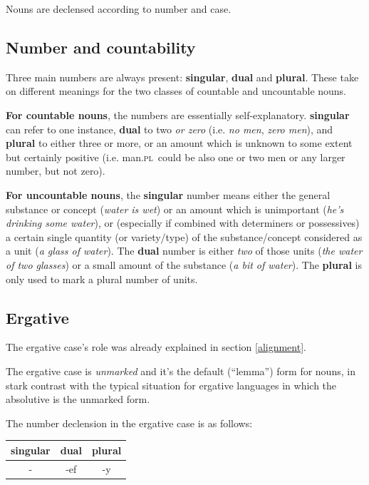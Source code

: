 \documentclass[10pt,oneside]{memoir}
\newcommand{\grammar}[1]{\textsc{#1}}
\newcommand{\PL}{\grammar{pl}}
\begin{document}
\begin{multicols}{2}

Nouns are declensed according to number and case. 

\subsection{Number and countability}

Three main numbers are always present: \textbf{singular}, \textbf{dual} and \textbf{plural}. These take on different meanings for the two classes of countable and uncountable nouns.

\textbf{For countable nouns}, the numbers are essentially self-explanatory. \textbf{singular} can refer to one instance, \textbf{dual} to two \emph{or zero} (i.e. \emph{no men}, \emph{zero men}), and \textbf{plural} to either three or more, or an amount which is unknown to some extent but certainly positive (i.e. man.\PL\ could be also one or two men or any larger number, but not zero).

\textbf{For uncountable nouns}, the \textbf{singular} number means either the general substance or concept (\emph{water is wet}) or an amount which is unimportant (\emph{he's drinking some water}), or (especially if combined with determiners or possessives) a certain single quantity (or variety/type) of the substance/concept considered as a unit (\emph{a glass of water}). The \textbf{dual} number is either \emph{two} of those units (\emph{the water of two glasses}) or a small amount of the substance (\emph{a bit of water}). The \textbf{plural} is only used to mark a plural number of units.

\subsection{Ergative}

The ergative case's role was already explained in section \ref{alignment}.

The ergative case is \emph{unmarked} and it's the default (``lemma'') form for nouns, in stark contrast with the typical situation for ergative languages in which the absolutive is the unmarked form.

The number declension in the ergative case is as follows:

\begin{center}
    \begin{tabular}[]{ c| c| c }
             singular & dual & plural\\
            \hline
             -        & -ef  & -y
    \end{tabular}
\end{center}


\end{multicols}
\end{document}
